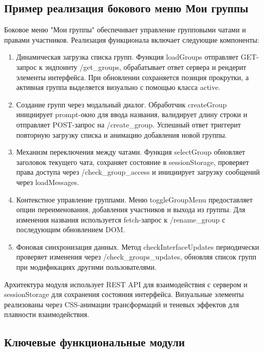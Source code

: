 \subsection{Пример реализация бокового меню Мои группы}

Боковое меню "Мои группы" обеспечивает управление групповыми чатами и правами участников. Реализация функционала включает следующие компоненты:

\begin{enumerate}
	\item Динамическая загрузка списка групп. Функция loadGroups отправляет GET-запрос к эндпоинту {/get\_groups}, обрабатывает ответ сервера и рендерит элементы интерфейса. При обновлении сохраняется позиция прокрутки, а активная группа выделяется визуально с помощью класса active.
	
	\item Создание групп через модальный диалог. Обработчик createGroup инициирует prompt-окно для ввода названия, валидирует длину строки и отправляет POST-запрос на /create\_group. Успешный ответ триггерит повторную загрузку списка и анимацию добавления новой группы.
	
	\item Механизм переключения между чатами. Функция selectGroup обновляет заголовок текущего чата, сохраняет состояние в sessionStorage, проверяет права доступа через /check\_group\_access и инициирует загрузку сообщений через loadMessages.
	
	\item Контекстное управление группами. Меню toggleGroupMenu предоставляет опции переименования, добавления участников и выхода из группы. Для изменения названия используется fetch-запрос к /rename\_group с последующим обновлением DOM.
	
	\item Фоновая синхронизация данных. Метод checkInterfaceUpdates периодически проверяет изменения через /check\_groups\_updates, обновляя список групп при модификациях другими пользователями.
\end{enumerate}

Архитектура модуля использует REST API для взаимодействия с сервером и sessionStorage для сохранения состояния интерфейса. Визуальные элементы реализованы через CSS-анимации трансформаций и теневых эффектов для плавности взаимодействия.

\subsection{Ключевые функциональные модули}

